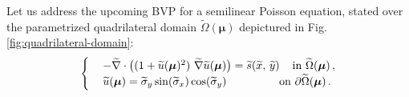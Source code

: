 \documentclass[12pt, a4paper, twoside, openright, notitlepage]{report}
\numberwithin{equation}{chapter}
\theoremstyle{theorem}
\theoremstyle{definition}
\theoremstyle{remark}
\theoremstyle{proposition}
\numberwithin{figure}{chapter}
\newcommand{\wt}[1]{\widetilde{#1}}
\newcommand{\bg}[1]{\boldsymbol{#1}}
\begin{document}
		Let us address the upcoming BVP for a semilinear Poisson equation, stated over the parametrized quadrilateral domain $\wt{\Omega}(\bg{\mu})$ depictured in Fig. \ref{fig:quadrilateral-domain}: 
		\begin{equation}
			\label{eq:poisson2d-2}
			\begin{cases}
				& - \wt{\nabla} \cdot \big( (1 + \wt{u}(\bg{\mu})^2) ~ \wt{\nabla} \wt{u}(\bg{\mu}) \big) = \wt{s}(\wt{x}, \, \wt{y}) \hspace*{0.4cm} \text{in $\wt{\Omega}(\bg{\mu})$} \, , \\
				& \wt{u}(\bg{\mu}) = \wt{\sigma}_y \sin(\wt{\sigma}_x) \cos(\wt{\sigma}_y) \hspace*{1.65cm} \text{on $\partial \wt{\Omega}(\bg{\mu})$} \, .
			\end{cases}
		\end{equation}
\end{document}
